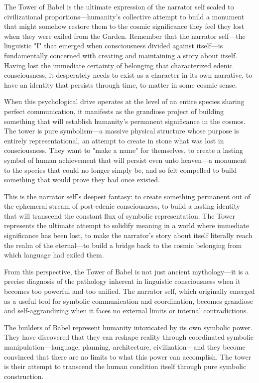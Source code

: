 The Tower of Babel is the ultimate expression of the narrator self scaled to civilizational proportions—humanity's collective attempt to build a monument that might somehow restore them to the cosmic significance they feel they lost when they were exiled from the Garden. Remember that the narrator self—the linguistic "I" that emerged when consciousness divided against itself—is fundamentally concerned with creating and maintaining a story about itself. Having lost the immediate certainty of belonging that characterized edenic consciousness, it desperately needs to exist as a character in its own narrative, to have an identity that persists through time, to matter in some cosmic sense.

When this psychological drive operates at the level of an entire species sharing perfect communication, it manifests as the grandiose project of building something that will establish humanity's permanent significance in the cosmos. The tower is pure symbolism—a massive physical structure whose purpose is entirely representational, an attempt to create in stone what was lost in consciousness. They want to "make a name" for themselves, to create a lasting symbol of human achievement that will persist even unto heaven—a monument to the species that could no longer simply be, and so felt compelled to build something that would prove they had once existed.

This is the narrator self's deepest fantasy: to create something permanent out of the ephemeral stream of post-edenic consciousness, to build a lasting identity that will transcend the constant flux of symbolic representation. The Tower represents the ultimate attempt to solidify meaning in a world where immediate significance has been lost, to make the narrator's story about itself literally reach the realm of the eternal—to build a bridge back to the cosmic belonging from which language had exiled them.

From this perspective, the Tower of Babel is not just ancient mythology—it is a precise diagnosis of the pathology inherent in linguistic consciousness when it becomes too powerful and too unified. The narrator self, which originally emerged as a useful tool for symbolic communication and coordination, becomes grandiose and self-aggrandizing when it faces no external limits or internal contradictions.

The builders of Babel represent humanity intoxicated by its own symbolic power. They have discovered that they can reshape reality through coordinated symbolic manipulation—language, planning, architecture, civilization—and they become convinced that there are no limits to what this power can accomplish. The tower is their attempt to transcend the human condition itself through pure symbolic construction.

